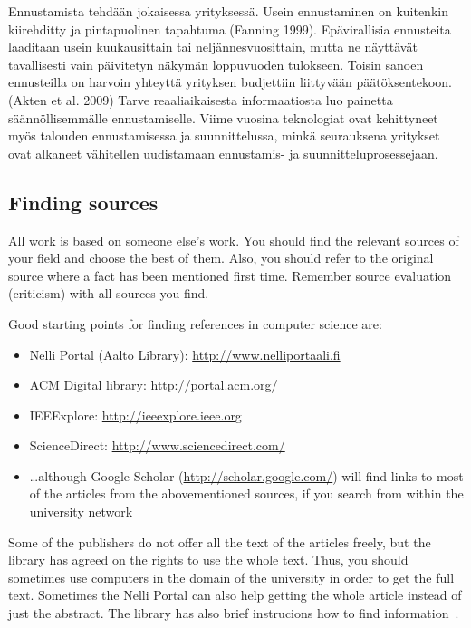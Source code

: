 \documentclass[12pt,a4paper,oneside,pdftex]{report}
\begin{document}
Ennustamista tehdään jokaisessa yrityksessä. Usein ennustaminen on kuitenkin kiirehditty ja pintapuolinen tapahtuma (Fanning 1999). Epävirallisia ennusteita laaditaan usein kuukausittain tai neljännesvuosittain, mutta ne näyttävät tavallisesti vain päivitetyn näkymän loppuvuoden tulokseen. Toisin sanoen ennusteilla on harvoin yhteyttä yrityksen budjettiin liittyvään päätöksentekoon. (Akten et al. 2009) Tarve reaaliaikaisesta informaatiosta luo painetta säännöllisemmälle ennustamiselle. Viime vuosina teknologiat ovat kehittyneet myös talouden ennustamisessa ja suunnittelussa, minkä seurauksena yritykset ovat alkaneet vähitellen uudistamaan ennustamis- ja suunnitteluprosessejaan.

\subsection{Finding sources}

All work is based on someone else's work. You should find the relevant
sources of your field and choose the best of them. Also, you should
refer to the original source where a fact has been mentioned first
time. Remember source evaluation (criticism) with all sources you
find.

Good starting points for finding references in computer science are:
\begin{itemize}
\setlength{\itemsep}{0pt}
\item Nelli Portal (Aalto Library): \url{http://www.nelliportaali.fi}
\item ACM Digital library: \url{http://portal.acm.org/}
\item IEEExplore: \url{http://ieeexplore.ieee.org}
\item ScienceDirect: \url{http://www.sciencedirect.com/}
\item \ldots although Google Scholar (\url{http://scholar.google.com/}) will
find links to most of the articles from the abovementioned sources, if you
search from within the university network
\end{itemize}

Some of the publishers do not offer all the text of the articles
freely, but the library has agreed on the rights to use the whole
text. Thus, you should sometimes use computers in the domain of the
university in order to get the full text. Sometimes the Nelli Portal
can also help getting the whole article instead of just the abstract.
The library has also brief instrucions how to find
information~\cite{howfindinfo}.
\end{document}
